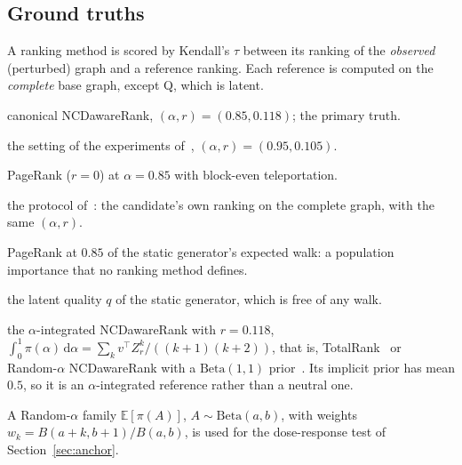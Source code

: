 \documentclass[11pt,a4paper]{article}
\theoremstyle{definition}
\theoremstyle{remark}
\newcommand{\Exp}{\mathbb{E}}
\begin{document}
\subsection{Ground truths}
\label{sec:truths}
A ranking method is scored by Kendall's $\tau$ between its ranking of the \emph{observed} (perturbed)
graph and a reference ranking. Each reference is computed on the \emph{complete} base graph, except Q,
which is latent.
\begin{description}[leftmargin=1.2em,itemsep=1pt,font=\normalfont\bfseries]
\item[NCD] canonical NCDawareRank, $(\alpha,r)=(0.85,0.118)$; the primary truth.
\item[NCD95] the setting of the experiments of~\cite{ng13}, $(\alpha,r)=(0.95,0.105)$.
\item[PR] PageRank ($r=0$) at $\alpha=0.85$ with block-even teleportation.
\item[SELF] the protocol of~\cite{ng13}: the candidate's own ranking on the complete graph, with the same
$(\alpha,r)$.
\item[POP] PageRank at $0.85$ of the static generator's expected walk: a population importance that no
ranking method defines.
\item[Q] the latent quality $q$ of the static generator, which is free of any walk.
\item[TOT] the $\alpha$-integrated NCDawareRank with $r=0.118$,
$\int_0^1\pi(\alpha)\,\mathrm d\alpha=\sum_k v^\top Z_r^k/((k+1)(k+2))$, that is, TotalRank~\cite{boldi05tr}
or Random-$\alpha$ NCDawareRank with a $\mathrm{Beta}(1,1)$ prior~\cite{constantine09}. Its implicit
prior has mean $0.5$, so it is an $\alpha$-integrated reference rather than a neutral one.
\end{description}
A Random-$\alpha$ family $\Exp[\pi(A)]$, $A\sim\mathrm{Beta}(a,b)$, with weights
$w_k=B(a+k,b+1)/B(a,b)$, is used for the dose-response test of Section~\ref{sec:anchor}.
\end{document}

